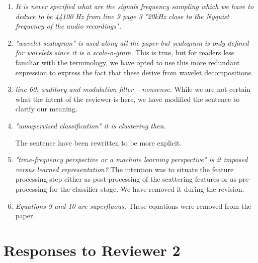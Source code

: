 \documentclass[10pt]{article}
\begin{document}
\begin{enumerate}
\item \emph{It is never specified what are the signals frequency sampling which we have to deduce to be 44100 Hz from line 9 page 3 "20kHz close to the Nyquist frequency of the audio recordings".}

\item \emph{"wavelet scalogram" is used along all the paper but scalogram is only defined for wavelets since 
it is a scale-o-gram.}
This is true, but for readers less familiar with the terminology, we have opted to use this more redundant expression to express the fact that these derive from wavelet decompositions.

\item \emph{line 60: auditory and modulation filter – nonsense.}
While we are not certain what the intent of the reviewer is here, we have modified the sentence to clarify our meaning.

\item \emph{"unsupervised classification" it is clustering then.}

The sentence have been rewritten to be more explicit.

\item \emph{"time-frequency perspective or a machine learning perspective" is it imposed versus learned representation? }
The intention was to situate the feature processing step either as post-processing of the scattering features or as pre-processing for the classifier stage. We have removed it during the revision.

\item \emph{Equations 9 and 10 are superfluous.}
These equations were removed from the paper.

\end{enumerate}

\section{Responses to Reviewer 2}
\end{document}
